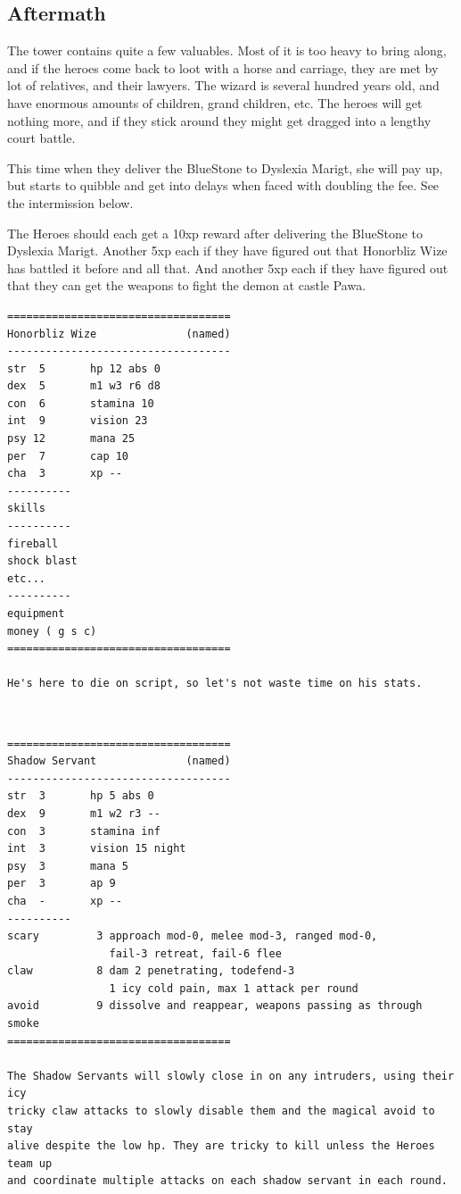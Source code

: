 \subsection*{Aftermath}
The tower contains quite a few valuables. Most of it is too heavy to bring along, and if the heroes come back to loot with a horse and carriage, they are met by lot of relatives, and their lawyers. The wizard is several hundred years old, and have enormous amounts of children, grand children, etc. The heroes will get nothing more, and if they stick around they might get dragged into a lengthy court battle.

This time when they deliver the BlueStone to Dyslexia Marigt, she will pay up, but starts to quibble and get into delays when faced with doubling the fee. See the intermission below.

The Heroes should each get a 10xp reward after delivering the BlueStone to Dyslexia Marigt. Another 5xp each if they have figured out that Honorbliz Wize has battled it before and all that. And another 5xp each if they have figured out that they can get the weapons to fight the demon at castle Pawa.


\raggedbottom

\goodbreak \begin{samepage} \vsmall \begin{verbatim}
===================================
Honorbliz Wize              (named)
-----------------------------------
str  5       hp 12 abs 0
dex  5       m1 w3 r6 d8
con  6       stamina 10
int  9       vision 23
psy 12       mana 25
per  7       cap 10
cha  3       xp --
----------
skills
----------
fireball
shock blast
etc...
----------
equipment
money ( g s c)
===================================

He's here to die on script, so let's not waste time on his stats.
\end{verbatim} \normalsize \end{samepage}

\

\goodbreak \begin{samepage} \vsmall \begin{verbatim}
===================================
Shadow Servant              (named)
-----------------------------------
str  3       hp 5 abs 0
dex  9       m1 w2 r3 --
con  3       stamina inf
int  3       vision 15 night
psy  3       mana 5
per  3       ap 9
cha  -       xp --
----------
scary         3 approach mod-0, melee mod-3, ranged mod-0,
                fail-3 retreat, fail-6 flee
claw          8 dam 2 penetrating, todefend-3
                1 icy cold pain, max 1 attack per round
avoid         9 dissolve and reappear, weapons passing as through smoke
===================================

The Shadow Servants will slowly close in on any intruders, using their icy
tricky claw attacks to slowly disable them and the magical avoid to stay
alive despite the low hp. They are tricky to kill unless the Heroes team up
and coordinate multiple attacks on each shadow servant in each round.
\end{verbatim} \normalsize \end{samepage}

